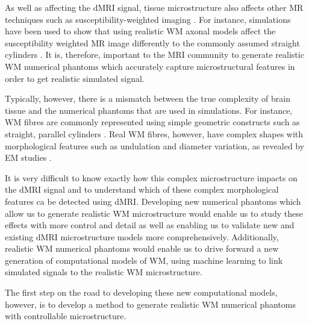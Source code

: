 As well as affecting the dMRI signal, tissue microstructure also affects other MR techniques such as susceptibility-weighted imaging \cite{Li2012,Lee2010}. For instance, simulations have been used to show that using realistic \ac{WM} axonal models affect the susceptibility weighted MR image differently to the commonly assumed straight cylinders \cite{Xu2018}.
It is, therefore, important to the MRI community to generate realistic \ac{WM} numerical phantoms which accurately capture microstructural features in order to get realistic simulated signal.

Typically, however, there is a mismatch between the true complexity of brain tissue and the numerical phantoms that are used in simulations.
For instance, \ac{WM} fibres are commonly represented using simple geometric constructs such as straight, parallel cylinders \cite{Nilsson2010,Fieremans2010,Nilsson2009,Ford1997,Hall2009,Alexander2010}. Real \ac{WM} fibres, however, have complex shapes with morphological features such as undulation and diameter variation, as revealed by \ac{EM} studies \cite{Abdollahzadeh2019, Lee2019b}.

It is very difficult to know exactly how this complex microstructure impacts on the \ac{dMRI} signal and to understand which of these complex morphological features ca be detected using \ac{dMRI}.
Developing new numerical phantoms which allow us to generate realistic \ac{WM} microstructure would enable us to study these effects with more control and detail as well as enabling us to validate new and existing \ac{dMRI} microstructure models more comprehensively.
Additionally, realistic \ac{WM} numerical phantoms would enable us to drive forward a new generation of computational models of \ac{WM}, using machine learning to link simulated signals to the realistic \ac{WM} microstructure.

The first step on the road to developing these new computational models, however, is to develop a method to generate realistic \ac{WM} numerical phantoms with controllable microstructure.



